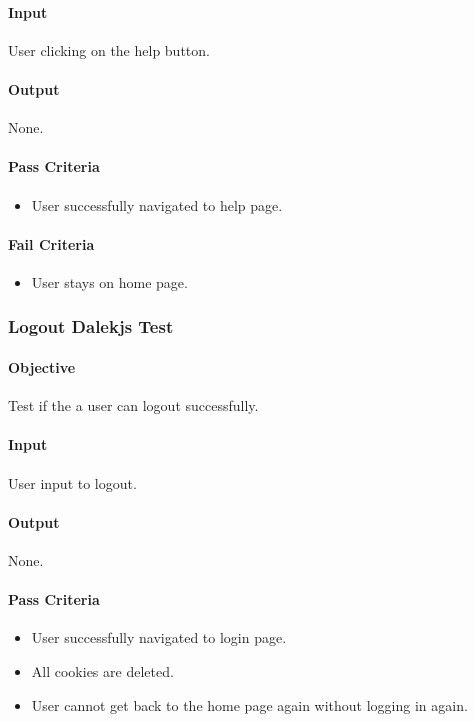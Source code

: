 \documentclass[hidelinks,english]{article}
\begin{document}
    			\paragraph{Input} User clicking on the help button.
    			\paragraph{Output} None.
			    \paragraph{Pass Criteria}
				\begin{itemize}
				    \item User successfully navigated to help page.
				\end{itemize}
				\paragraph{Fail Criteria}
				\begin{itemize}
				    \item User stays on home page.
				\end{itemize}
			\subsubsection{Logout Dalekjs Test}\label{frontendlogoutdalekjstest}
    			\paragraph{Objective} Test if the a user can logout successfully.
    			\paragraph{Input} User input to logout.
    			\paragraph{Output} None.
			    \paragraph{Pass Criteria}
				\begin{itemize}
				    \item User successfully navigated to login page.
				    \item All cookies are deleted.
				    \item User cannot get back to the home page again without logging in again.
				\end{itemize}
\end{document}
